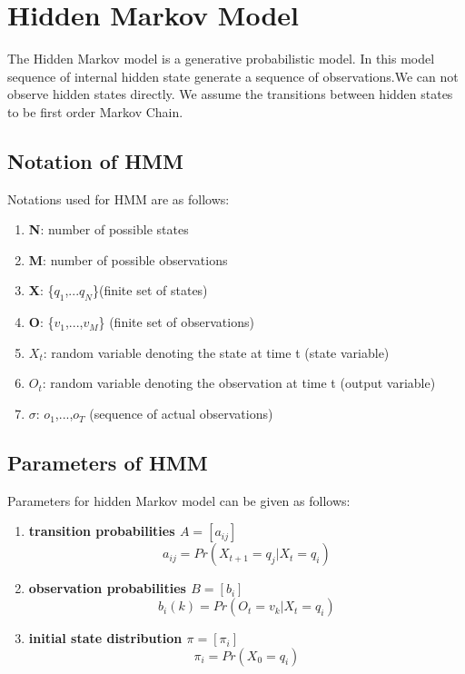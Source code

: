 \documentclass[11pt]{report}
\begin{document}
\newpage
\section{Hidden Markov Model}
The Hidden Markov model is a generative probabilistic model. In this model sequence of internal hidden state generate a sequence of observations.We can not observe hidden states directly. We assume the transitions between hidden states to be first order Markov Chain.\\

\subsection{Notation of HMM} 
Notations  used for HMM are as follows:
\begin{enumerate}
\item \textbf{N}: number of possible states
\item \textbf{M}: number of possible observations
\item \textbf{X}: \{$q_{1}$,...$q_{N}$\}(finite set of states)
\item \textbf{O}: \{$v_{1}$,...,$v_{M}$\} (finite set of observations)
\item \textbf{$X_{t}$}: random variable denoting the state at time t (state variable)
\item \textbf{$O_{t}$}: random variable denoting the observation at time t (output variable)
\item \textbf{$\sigma$}: {$o_{1}$,...,$o_{T}$} (sequence of actual observations) 
\end{enumerate}

\subsection{Parameters of HMM} 
Parameters for hidden Markov model can be given as follows:
\begin{enumerate}
\item \textbf{transition probabilities $A=[a_{ij}]$}
\begin{equation}
a_{ij} = Pr(X_{t+1} = q_{j} |X_{t} = q_{i}) 
\end{equation}

\item \textbf{observation probabilities $B=[b_{i}]$}
\begin{equation}
b_{i}(k) = Pr(O_{t} = v_{k} | X_{t} = q_{i})
\end{equation}

\item \textbf{initial state distribution ${\pi}=[{\pi}_{i}]$}
\begin{equation}
{\pi}_{i} = Pr(X_{0} = q_{i}) 
\end{equation}
\end{enumerate}
\end{document}

